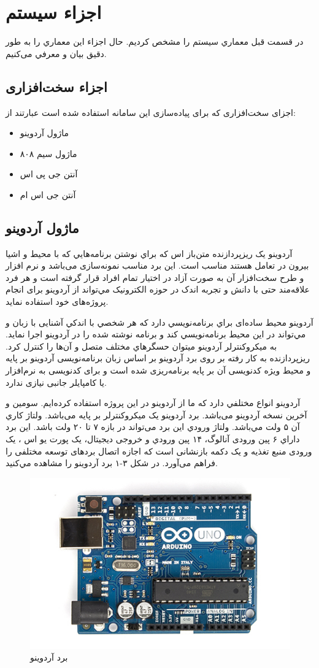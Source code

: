 \section{اجزاء سیستم}
در قسمت قبل معماري سيستم را مشخص كرديم. حال اجزاء اين معماري را به طور دقيق بيان و معرفي می‌کنیم.
\subsection{اجزاء سخت‌افزاری}
اجزای سخت‌افزاری که برای پیاده‌سازی این سامانه استفاده شده است عبارتند از:
\begin{itemize}
	\item
	ماژول آردوینو
	\item
ماژول سیم ۸۰۸
	\item
	آنتن جی پی اس
	\item
	آنتن جی اس ام
\end{itemize}
\subsection{ماژول آردوینو}
آردوينو يک ريزپردازنده متن‌باز اس كه براي نوشتن برنامه‌هايي كه با محیط و اشیا بیرون در تعامل هستند مناسب است. این برد مناسب نمونه‌سازی می‌باشد و نرم افزار و طرح سخت‌افزار آن به صورت آزاد در اختیار تمام افراد قرار گرفته است و هر فرد علاقه‌مند حتی با دانش و تجربه اندک در حوزه الکترونیک مي‌تواند از آردوینو برای انجام پروژه‌های خود استفاده نماید.


آردوينو محیط ساده‌ای براي برنامه‌نويسي دارد كه هر شخصي با اندكي آشنایی با زبان  و   مي‌تواند در این محیط برنامه‌نويسي كند و برنامه نوشته شده را در آردوینو اجرا نماید. به ميكروكنترلر آردوينو ميتوان حسگرهاي مختلف متصل و آن‌ها را كنترل كرد. ریزپردازنده به‌ کار رفته بر روی برد آردوینو بر اساس زبان برنامه‌نویسی آردوینو بر پایه  و محیط ویژه کدنویسی آن بر پایه برنامه‌ریزی شده است و برای کدنویسی به نرم‌افزار یا کامپایلر جانبی نیازی ندارد. 


آردوينو انواع مختلفي دارد كه ما از آردوینو  در این پروژه استفاده کرده‌ایم.  سومین و آخرین نسخه آردوینو  می‌باشد. برد آردوینو  یک میکروکنترلر بر پایه  می‌باشد. ولتاژ كاري آن ۵ ولت مي‌باشد. ولتاژ ورودي این برد می‌تواند در بازه ۷ تا ۲۰ ولت باشد. این برد داراي ۶ پین ورودی آنالوگ، ۱۴ پين ورودي و خروجی ديجيتال، یک پورت یو اس ، یک ورودی منبع تغذیه و یک دکمه بازنشانی  است که اجازه اتصال بردهای توسعه مختلفی را فراهم می‌آورد. در شكل ۳-۱ برد آردوينو  را مشاهده مي‌كنيد.
\begin{figure}[!h]
	\centerline{\includegraphics[width=.5\textwidth]{ArduinoUno_R3}}
	\caption{برد آردوینو }
\end{figure}
